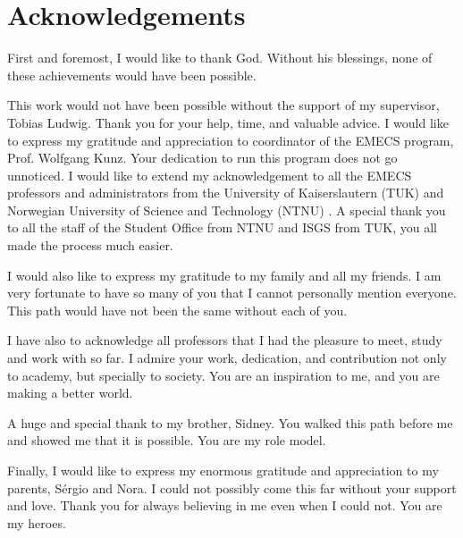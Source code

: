 \chapter*{Acknowledgements}


First and foremost, I would like to thank God. Without his blessings, none of these achievements would have been possible.

This work would not have been possible without the support of my supervisor, Tobias Ludwig. Thank you for your help, time, and valuable advice. I would like to express my gratitude and appreciation to coordinator of the EMECS program, Prof. Wolfgang Kunz. Your dedication to run this program does not go unnoticed. I would like to extend my acknowledgement to all the EMECS professors and administrators from the University of Kaiserslautern (TUK) and Norwegian University of Science and Technology (NTNU) . A special thank you to all the staff of the Student Office from NTNU and ISGS from TUK, you all made the process much easier. 

I would also like to express my gratitude to my family and all my friends. I am very fortunate to have so many of you that I cannot personally mention everyone. This path would have not been the same without each of you.

I have also to acknowledge all professors that I had the pleasure to meet, study and work with so far. I admire your work, dedication, and contribution not only to academy, but specially to society. You are an inspiration to me, and you are making a better world. 

A huge and special thank to my brother, Sidney. You walked this path before me and showed me that it is possible. You are my role model. 

Finally, I would like to express my enormous gratitude and appreciation to my parents, Sérgio and Nora. I could not possibly come this far without your support and love. Thank you for always believing in me even when I could not. You are my heroes.
